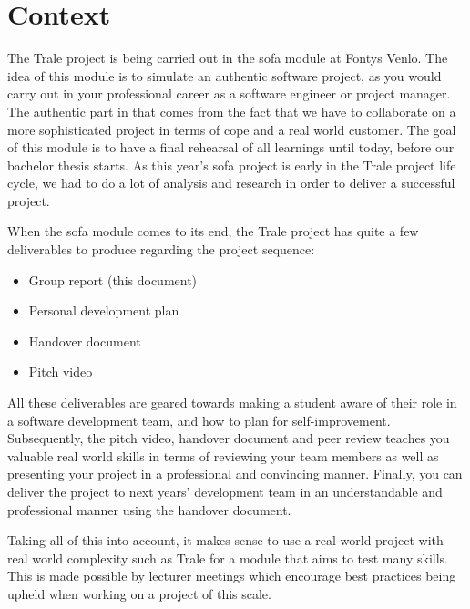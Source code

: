 \chapter{Context}\label{ch:context}
The Trale project is being carried out in the \ac{sofa} module at Fontys Venlo.
The idea of this module is to simulate an authentic software project, as you would carry out in your professional career
as a software engineer or project manager.
The authentic part in that comes from the fact that we have to collaborate on a more sophisticated project in terms of
cope and a real world customer.
The goal of this module is to have a final rehearsal of all learnings until today, before our bachelor thesis starts.
As this year's \ac{sofa} project is early in the Trale project life cycle, we had to do a lot of analysis and research
in order to deliver a successful project.

When the \ac{sofa} module comes to its end, the Trale project has quite a few deliverables to produce regarding the
project sequence:

\begin{itemize}\setlength\itemsep{-.5em}
    \item Group report (this document)
    \item Personal development plan
    \item Handover document
    \item Pitch video
\end{itemize}

All these deliverables are geared towards making a student aware of their role in a software development team, and how
to plan for self-improvement.
Subsequently, the pitch video, handover document and peer review teaches you valuable real world skills in terms of
reviewing your team members as well as presenting your project in a professional and convincing manner.
Finally, you can deliver the project to next years' development team in an understandable and professional manner using
the handover document.

Taking all of this into account, it makes sense to use a real world project with real world complexity such as Trale
for a module that aims to test many skills.
This is made possible by lecturer meetings which encourage best practices being upheld when working on a project of
this scale.
